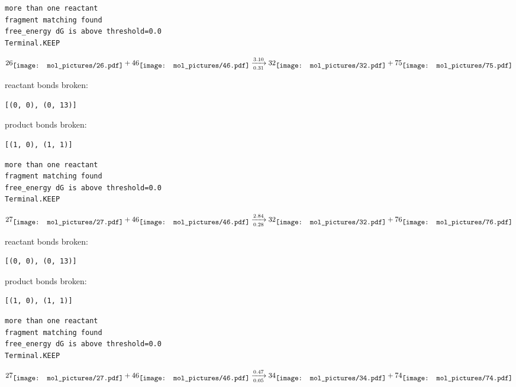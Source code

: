 \documentclass{article}
\begin{document}
\vspace{1cm}
\begin{verbatim}
more than one reactant
fragment matching found
free_energy dG is above threshold=0.0
Terminal.KEEP
\end{verbatim}
$$
26
\raisebox{-.5\height}{\texttt{[image: mol\_pictures/26.pdf]}}
+
46
\raisebox{-.5\height}{\texttt{[image: mol\_pictures/46.pdf]}}
\xrightarrow[0.31]{3.10}
32
\raisebox{-.5\height}{\texttt{[image: mol\_pictures/32.pdf]}}
+
75
\raisebox{-.5\height}{\texttt{[image: mol\_pictures/75.pdf]}}
$$


reactant bonds broken:\begin{verbatim}
[(0, 0), (0, 13)]
\end{verbatim}
product bonds broken:\begin{verbatim}
[(1, 0), (1, 1)]
\end{verbatim}




\vspace{1cm}
\begin{verbatim}
more than one reactant
fragment matching found
free_energy dG is above threshold=0.0
Terminal.KEEP
\end{verbatim}
$$
27
\raisebox{-.5\height}{\texttt{[image: mol\_pictures/27.pdf]}}
+
46
\raisebox{-.5\height}{\texttt{[image: mol\_pictures/46.pdf]}}
\xrightarrow[0.28]{2.84}
32
\raisebox{-.5\height}{\texttt{[image: mol\_pictures/32.pdf]}}
+
76
\raisebox{-.5\height}{\texttt{[image: mol\_pictures/76.pdf]}}
$$


reactant bonds broken:\begin{verbatim}
[(0, 0), (0, 13)]
\end{verbatim}
product bonds broken:\begin{verbatim}
[(1, 0), (1, 1)]
\end{verbatim}




\vspace{1cm}
\begin{verbatim}
more than one reactant
fragment matching found
free_energy dG is above threshold=0.0
Terminal.KEEP
\end{verbatim}
$$
27
\raisebox{-.5\height}{\texttt{[image: mol\_pictures/27.pdf]}}
+
46
\raisebox{-.5\height}{\texttt{[image: mol\_pictures/46.pdf]}}
\xrightarrow[0.05]{0.47}
34
\raisebox{-.5\height}{\texttt{[image: mol\_pictures/34.pdf]}}
+
74
\raisebox{-.5\height}{\texttt{[image: mol\_pictures/74.pdf]}}
$$
\end{document}
